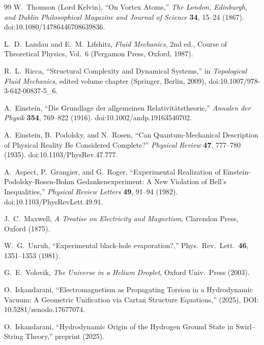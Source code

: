 \begin{thebibliography}{99}
        W.~Thomson (Lord Kelvin),
        ``On Vortex Atoms,''
        \textit{The London, Edinburgh, and Dublin Philosophical Magazine and Journal of Science} \textbf{34}, 15--24 (1867).
        doi:10.1080/14786446708639836.

        L.~D.~Landau and E.~M.~Lifshitz,
        \textit{Fluid Mechanics}, 2nd ed.,
        Course of Theoretical Physics, Vol.~6
        (Pergamon Press, Oxford, 1987).

        R.~L.~Ricca,
        ``Structural Complexity and Dynamical Systems,''
        in \textit{Topological Fluid Mechanics}, edited volume chapter (Springer, Berlin, 2009),
        doi:10.1007/978-3-642-00837-5\_6.

    A.~Einstein,
    ``Die Grundlage der allgemeinen Relativitätstheorie,''
    \textit{Annalen der Physik} \textbf{354}, 769--822 (1916).
    doi:10.1002/andp.19163540702.

    A.~Einstein, B.~Podolsky, and N.~Rosen,
    ``Can Quantum-Mechanical Description of Physical Reality Be Considered Complete?''
    \textit{Physical Review} \textbf{47}, 777--780 (1935).
    doi:10.1103/PhysRev.47.777.

    A.~Aspect, P.~Grangier, and G.~Roger,
    ``Experimental Realization of Einstein-Podolsky-Rosen-Bohm Gedankenexperiment:
    A New Violation of Bell's Inequalities,''
    \textit{Physical Review Letters} \textbf{49}, 91--94 (1982).
    doi:10.1103/PhysRevLett.49.91.

    J.~C.~Maxwell, \emph{A Treatise on Electricity and Magnetism},
    Clarendon Press, Oxford (1875).

    W.~G.~Unruh, ``Experimental black-hole evaporation?,''
    Phys.\ Rev.\ Lett.\ \textbf{46}, 1351--1353 (1981).

    G.~E.~Volovik, \emph{The Universe in a Helium Droplet},
    Oxford Univ.\ Press (2003).

    O.~Iskandarani, ``Electromagnetism as Propagating Torsion in a Hydrodynamic Vacuum: A Geometric Unification via Cartan Structure Equations,''
    (2025), DOI: 10.5281/zenodo.17677074.

    O.~Iskandarani, ``Hydrodynamic Origin of the Hydrogen Ground State in Swirl--String Theory,''
    preprint (2025).


\end{thebibliography}
